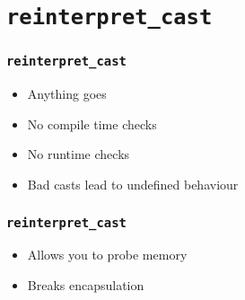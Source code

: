 \section{{\tt reinterpret\_cast}}

\frame{\tableofcontents[currentsection]}


\begin{frame}
  \frametitle{{\tt reinterpret\_cast}}
  \begin{itemize}
    \item Anything goes
    \item No compile time checks
    \item No runtime checks
    \item Bad casts lead to undefined behaviour
  \end{itemize}
\end{frame}

\begin{frame}
  \frametitle{{\tt reinterpret\_cast}}
  \begin{itemize}
    \item Allows you to probe memory
    \item Breaks encapsulation
  \end{itemize}
  \begin{overprint}
  \end{overprint}
\end{frame}


